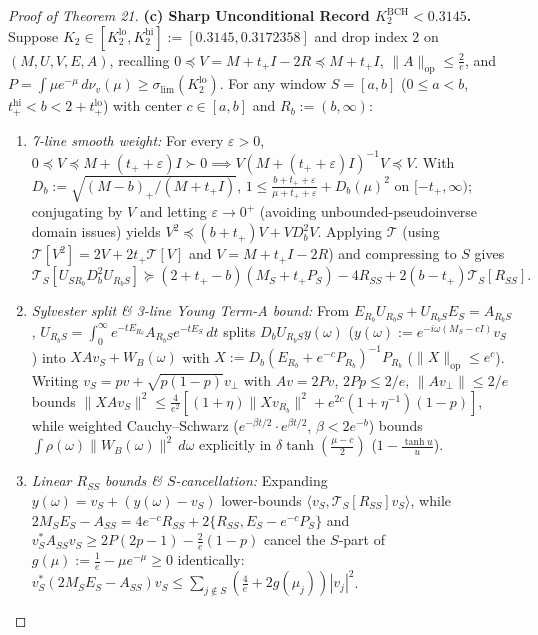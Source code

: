\documentclass[10pt,letterpaper]{article}
\newcommand{\op}{\mathrm{op}}
\begin{document}
\begin{proof}[Proof of Theorem 21]
\textbf{(c) Sharp Unconditional Record $K_2^{\mathrm{BCH}} < 0.3145$.}
Suppose $K_2 \in [K_2^{\mathrm{lo}}, K_2^{\mathrm{hi}}] := [0.3145, 0.3172358]$ and drop index $2$ on $(M, U, V, E, A)$, recalling $0 \preceq V = M + t_+ I - 2R \preceq M + t_+ I$, $\|A\|_{\op} \le \frac{2}{e}$, and $P = \int \mu e^{-\mu}\,d\nu_v(\mu) \ge \sigma_{\lim}(K_2^{\mathrm{lo}})$. For any window $S = [a, b]$ ($0 \le a < b$, $t_+^{\mathrm{hi}} < b < 2 + t_+^{\mathrm{lo}}$) with center $c \in [a, b]$ and $R_b := (b, \infty)$:
\begin{enumerate}[leftmargin=1.6em,itemsep=1.5pt]
  \item \emph{7-line smooth weight:} For every $\varepsilon > 0$, $0 \preceq V \preceq M + (t_+ + \varepsilon)I \succ 0 \implies V(M+(t_++\varepsilon)I)^{-1}V \preceq V$. With $D_b := \sqrt{(M-b)_+/(M+t_+ I)}$, $1 \le \frac{b+t_++\varepsilon}{\mu+t_++\varepsilon} + D_b(\mu)^2$ on $[-t_+, \infty)$; conjugating by $V$ and letting $\varepsilon \to 0^+$ (avoiding unbounded-pseudoinverse domain issues) yields $V^2 \preceq (b+t_+)V + V D_b^2 V$. Applying $\mathcal{T}$ (using $\mathcal{T}[V^2] = 2V + 2t_+\mathcal{T}[V]$ and $V = M+t_+I-2R$) and compressing to $S$ gives
  \[
    \mathcal{T}_S[U_{SR_b} D_b^2 U_{R_b S}] \succeq (2+t_+-b)(M_S + t_+ P_S) - 4 R_{SS} + 2(b-t_+)\mathcal{T}_S[R_{SS}].
  \]
  \item \emph{Sylvester split \& 3-line Young Term-A bound:} From $E_{R_b} U_{R_b S} + U_{R_b S} E_S = A_{R_b S}$, $U_{R_b S} = \int_0^\infty e^{-t E_{R_b}} A_{R_b S} e^{-t E_S}\,dt$ splits $D_b U_{R_b S} y(\omega)$ ($y(\omega) := e^{-i\omega(M_S-cI)}v_S$) into $X A v_S + W_B(\omega)$ with $X := D_b(E_{R_b}+e^{-c}P_{R_b})^{-1}P_{R_b}$ ($\|X\|_{\op} \le e^c$). Writing $v_S = pv + \sqrt{p(1-p)}v_\perp$ with $Av = 2Pv$, $2Pp \le 2/e$, $\|Av_\perp\| \le 2/e$ bounds $\|X A v_S\|^2 \le \frac{4}{e^2}[(1+\eta)\|X v_{R_b}\|^2 + e^{2c}(1+\eta^{-1})(1-p)]$, while weighted Cauchy--Schwarz ($e^{-\beta t/2}\cdot e^{\beta t/2}$, $\beta < 2e^{-b}$) bounds $\int \rho(\omega)\|W_B(\omega)\|^2\,d\omega$ explicitly in $\delta\tanh(\frac{\mu-c}{2})$ ($1 - \frac{\tanh u}{u}$).
  \item \emph{Linear $R_{SS}$ bounds \& $S$-cancellation:} Expanding $y(\omega) = v_S + (y(\omega)-v_S)$ lower-bounds $\langle v_S, \mathcal{T}_S[R_{SS}]v_S\rangle$, while $2M_S E_S - A_{SS} = 4e^{-c}R_{SS} + 2\{R_{SS}, E_S - e^{-c}P_S\}$ and $v_S^* A_{SS} v_S \ge 2P(2p-1) - \frac{2}{e}(1-p)$ cancel the $S$-part of $g(\mu) := \frac{1}{e} - \mu e^{-\mu} \ge 0$ identically: $v_S^*(2M_S E_S - A_{SS})v_S \le \sum_{j \notin S}(\frac{4}{e} + 2g(\mu_j))|v_j|^2$.

\end{enumerate}
\end{proof}
\end{document}
